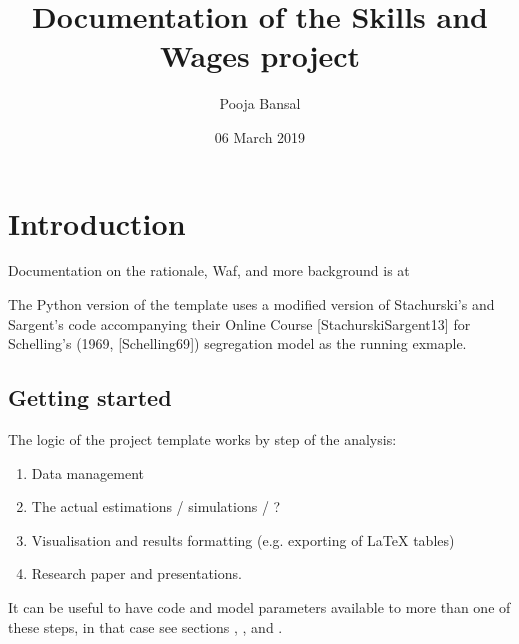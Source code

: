 \documentclass[a4paper,11pt,english]{sphinxmanual}
\title{Documentation of the Skills and Wages project}
\date{06 March 2019}
\author{Pooja Bansal}
\begin{document}
\pagestyle{empty}
\maketitle
\pagestyle{plain}
\sphinxtableofcontents
\pagestyle{normal}
\label{\detokenize{index::doc}}



\chapter{Introduction}
\label{\detokenize{introduction:introduction}}\label{\detokenize{introduction:id1}}\label{\detokenize{introduction::doc}}
Documentation on the rationale, Waf, and more background is at 

The Python version of the template uses a modified version of Stachurski’s and Sargent’s code accompanying their Online Course {[}StachurskiSargent13{]} for Schelling’s (1969, {[}Schelling69{]}) segregation model as the running exmaple.


\section{Getting started}
\label{\detokenize{introduction:getting-started}}\label{\detokenize{introduction:id4}}
  

The logic of the project template works by step of the analysis:
\begin{enumerate}
\def\theenumi{\arabic{enumi}}
\def\labelenumi{\theenumi .}
\makeatletter\def\p@enumii{\p@enumi \theenumi .}\makeatother
\item {} 
Data management

\item {} 
The actual estimations / simulations / ?

\item {} 
Visualisation and results formatting (e.g. exporting of LaTeX tables)

\item {} 
Research paper and presentations.

\end{enumerate}

It can be useful to have code and model parameters available to more than one of these steps, in that case see sections , , and {\hyperref[\detokenize{library:library}]{}}.
\end{document}
